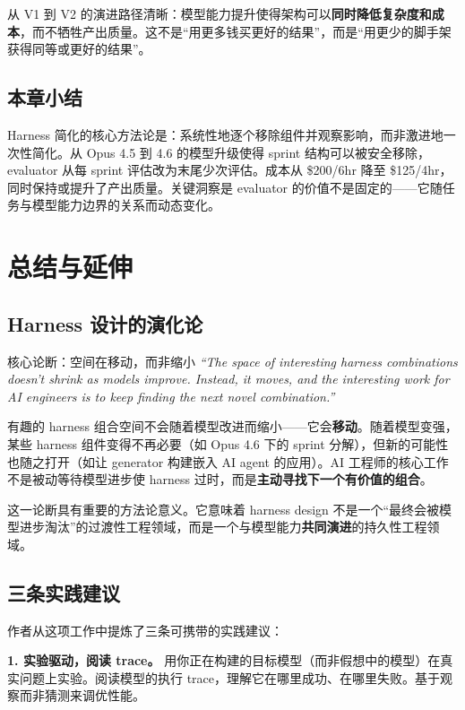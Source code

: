 \documentclass[a4paper]{article}
\begin{document}
从 V1 到 V2 的演进路径清晰：模型能力提升使得架构可以\textbf{同时降低复杂度和成本}，而不牺牲产出质量。这不是``用更多钱买更好的结果''，而是``用更少的脚手架获得同等或更好的结果''。

\subsection{本章小结}

Harness 简化的核心方法论是：系统性地逐个移除组件并观察影响，而非激进地一次性简化。从 Opus 4.5 到 4.6 的模型升级使得 sprint 结构可以被安全移除，evaluator 从每 sprint 评估改为末尾少次评估。成本从 \$200/6hr 降至 \$125/4hr，同时保持或提升了产出质量。关键洞察是 evaluator 的价值不是固定的——它随任务与模型能力边界的关系而动态变化。


\section{总结与延伸}

\subsection{Harness 设计的演化论}

\begin{importantbox}{核心论断：空间在移动，而非缩小}
\textit{``The space of interesting harness combinations doesn't shrink as models improve. Instead, it moves, and the interesting work for AI engineers is to keep finding the next novel combination.''}

有趣的 harness 组合空间不会随着模型改进而缩小——它会\textbf{移动}。随着模型变强，某些 harness 组件变得不再必要（如 Opus 4.6 下的 sprint 分解），但新的可能性也随之打开（如让 generator 构建嵌入 AI agent 的应用）。AI 工程师的核心工作不是被动等待模型进步使 harness 过时，而是\textbf{主动寻找下一个有价值的组合}。
\end{importantbox}

这一论断具有重要的方法论意义。它意味着 harness design 不是一个``最终会被模型进步淘汰''的过渡性工程领域，而是一个与模型能力\textbf{共同演进}的持久性工程领域。

\subsection{三条实践建议}

作者从这项工作中提炼了三条可携带的实践建议：

\textbf{1. 实验驱动，阅读 trace。} 用你正在构建的目标模型（而非假想中的模型）在真实问题上实验。阅读模型的执行 trace，理解它在哪里成功、在哪里失败。基于观察而非猜测来调优性能。
\end{document}
